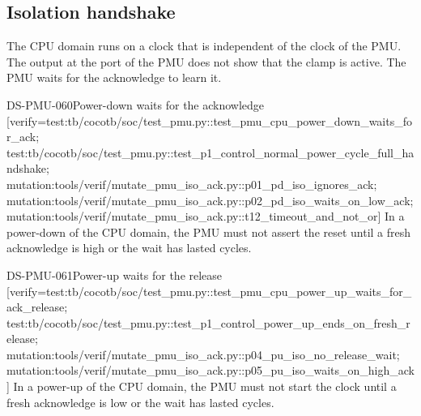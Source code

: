 \subsection{Isolation handshake}\label{ds:mod:pmu:handshake}
The CPU domain runs on a clock that is independent of the clock of the PMU. The output  at the port of the PMU does not show that the clamp is active. The PMU waits for the acknowledge to learn it.

\begin{requirement}{DS-PMU-060}{Power-down waits for the acknowledge}
[verify={test:tb/cocotb/soc/test_pmu.py::test_pmu_cpu_power_down_waits_for_ack; test:tb/cocotb/soc/test_pmu.py::test_p1_control_normal_power_cycle_full_handshake; mutation:tools/verif/mutate_pmu_iso_ack.py::p01_pd_iso_ignores_ack; mutation:tools/verif/mutate_pmu_iso_ack.py::p02_pd_iso_waits_on_low_ack; mutation:tools/verif/mutate_pmu_iso_ack.py::t12_timeout_and_not_or}]
In a power-down of the CPU domain, the PMU must not assert the reset until a fresh acknowledge is high or the wait has lasted  cycles.
\end{requirement}

\begin{requirement}{DS-PMU-061}{Power-up waits for the release}
[verify={test:tb/cocotb/soc/test_pmu.py::test_pmu_cpu_power_up_waits_for_ack_release; test:tb/cocotb/soc/test_pmu.py::test_p1_control_power_up_ends_on_fresh_release; mutation:tools/verif/mutate_pmu_iso_ack.py::p04_pu_iso_no_release_wait; mutation:tools/verif/mutate_pmu_iso_ack.py::p05_pu_iso_waits_on_high_ack}]
In a power-up of the CPU domain, the PMU must not start the clock until a fresh acknowledge is low or the wait has lasted  cycles.
\end{requirement}

